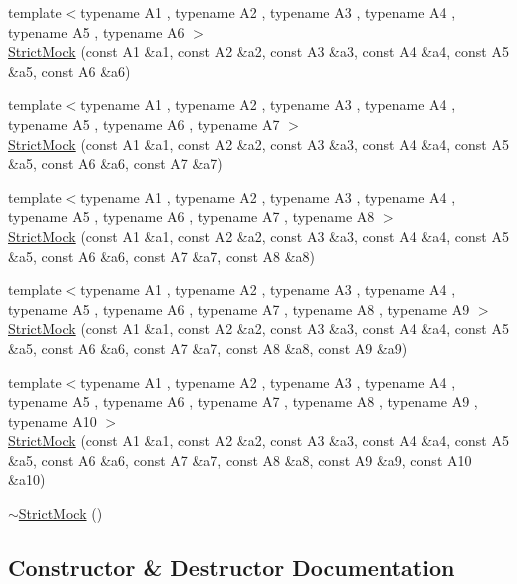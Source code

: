 \begin{DoxyCompactItemize}
{\footnotesize template$<$typename A1 , typename A2 , typename A3 , typename A4 , typename A5 , typename A6 $>$ }\\\mbox{\hyperlink{classtesting_1_1StrictMock_a17b452e1e2f57d7d10f7209587376eef}{Strict\+Mock}} (const A1 \&a1, const A2 \&a2, const A3 \&a3, const A4 \&a4, const A5 \&a5, const A6 \&a6)
\item 
{\footnotesize template$<$typename A1 , typename A2 , typename A3 , typename A4 , typename A5 , typename A6 , typename A7 $>$ }\\\mbox{\hyperlink{classtesting_1_1StrictMock_a4af48752fc22815250369292b9c064bc}{Strict\+Mock}} (const A1 \&a1, const A2 \&a2, const A3 \&a3, const A4 \&a4, const A5 \&a5, const A6 \&a6, const A7 \&a7)
\item 
{\footnotesize template$<$typename A1 , typename A2 , typename A3 , typename A4 , typename A5 , typename A6 , typename A7 , typename A8 $>$ }\\\mbox{\hyperlink{classtesting_1_1StrictMock_aac6eaaad3e94491ada7bb43ee6149775}{Strict\+Mock}} (const A1 \&a1, const A2 \&a2, const A3 \&a3, const A4 \&a4, const A5 \&a5, const A6 \&a6, const A7 \&a7, const A8 \&a8)
\item 
{\footnotesize template$<$typename A1 , typename A2 , typename A3 , typename A4 , typename A5 , typename A6 , typename A7 , typename A8 , typename A9 $>$ }\\\mbox{\hyperlink{classtesting_1_1StrictMock_a4129f247ae087d586fdb04f450422d3e}{Strict\+Mock}} (const A1 \&a1, const A2 \&a2, const A3 \&a3, const A4 \&a4, const A5 \&a5, const A6 \&a6, const A7 \&a7, const A8 \&a8, const A9 \&a9)
\item 
{\footnotesize template$<$typename A1 , typename A2 , typename A3 , typename A4 , typename A5 , typename A6 , typename A7 , typename A8 , typename A9 , typename A10 $>$ }\\\mbox{\hyperlink{classtesting_1_1StrictMock_a4936b0a5622b39e974deae12ecb1430b}{Strict\+Mock}} (const A1 \&a1, const A2 \&a2, const A3 \&a3, const A4 \&a4, const A5 \&a5, const A6 \&a6, const A7 \&a7, const A8 \&a8, const A9 \&a9, const A10 \&a10)
\item 
\mbox{\hyperlink{classtesting_1_1StrictMock_a1c7ec10ea86747bb23037380a7353bd1}{$\sim$\+Strict\+Mock}} ()
\end{DoxyCompactItemize}


\subsection{Constructor \& Destructor Documentation}
\mbox{\label{classtesting_1_1StrictMock_ad609d745db75306dd3b360b5410923fe}} 
